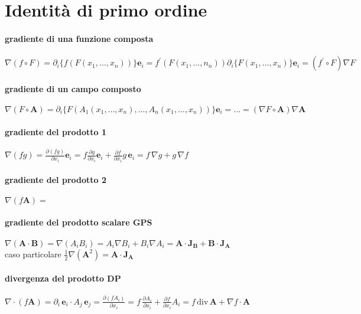 \documentclass[10pt,a4paper]{article}
\newcommand{\fracp}[2]{\frac{\partial #1}{\partial #2}}
\newcommand{\dive}[1]{\text{div}\,#1}
\begin{document}
	\section{Identità di primo ordine}
\paragraph{gradiente di una funzione composta} $\nabla(f\circ F) = \partial_i\{f(F(x_1,\ldots,x_n))\}\mathbf e_i = f^\prime(F(x_1,\ldots,n_n))\partial_i\{F(x_1,\ldots,x_n)\}\mathbf e_i = (f^\prime\circ F) \nabla F$
	
\paragraph{gradiente di un campo composto} $\nabla(F\circ\mathbf A) = \partial_i\{F(A_1(x_1,\ldots,x_n),\ldots,A_n(x_1,\ldots,x_n))\}\mathbf e_i = \ldots= (\nabla F\circ\mathbf A)\nabla \mathbf A$

\paragraph{gradiente del prodotto 1} $\nabla (f g) = \fracp{(fg)}{x_i} \mathbf e_i = f \fracp{g}{x_i} \mathbf e_i + \fracp{f}{x_i} g\, \mathbf e_i = f\,\nabla g+g\,\nabla f$

\paragraph{gradiente del prodotto 2} $\nabla (f \mathbf A) = $

\paragraph{gradiente del prodotto scalare GPS} $\nabla(\mathbf A \cdot \mathbf B) = \nabla(A_iB_i) = A_i\nabla B_i + B_i\nabla A_i = \mathbf A \cdot \mathbf J_\mathbf B + \mathbf B \cdot \mathbf J_\mathbf A$\\
caso particolare $\frac 12 \nabla (\mathbf A^2) = \mathbf A \cdot \mathbf J_\mathbf A$

\paragraph{divergenza del prodotto DP} $\nabla \cdot (f \mathbf A) = \partial_i\, \mathbf e_i \cdot A_j\, \mathbf e_j = \fracp{(f A_i)}{x_i}=f\, \fracp{A_i}{x_i} + \fracp{f}{x_i} A_i=f\, \dive{\mathbf A} + \nabla f \cdot \mathbf A$
\end{document}
